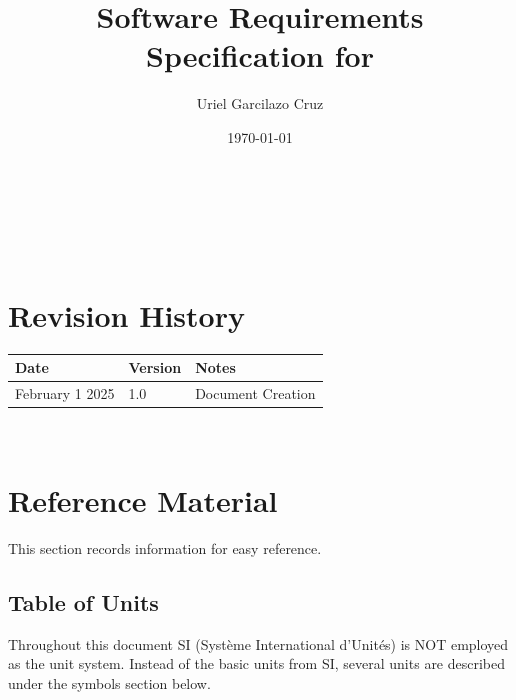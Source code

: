 \documentclass[12pt]{article}
\begin{document}
\title{Software Requirements Specification for \progname} 
\author{Uriel Garcilazo Cruz}
\date{\today}
	
\maketitle

~\newpage


\tableofcontents

~\newpage

\section*{Revision History}

\begin{tabularx}{\textwidth}{p{3cm}p{2cm}X}
\toprule {\bf Date} & {\bf Version} & {\bf Notes}\\
\midrule
February 1 2025 & 1.0 & Document Creation\\
\bottomrule
\end{tabularx}


~\newpage

\section{Reference Material}

This section records information for easy reference.

\subsection{Table of Units}

Throughout this document SI (Syst\`{e}me International d'Unit\'{e}s) is NOT employed
as the unit system.  Instead of the basic units from SI, several units
are described under the symbols section below.

~\newline
\end{document}
